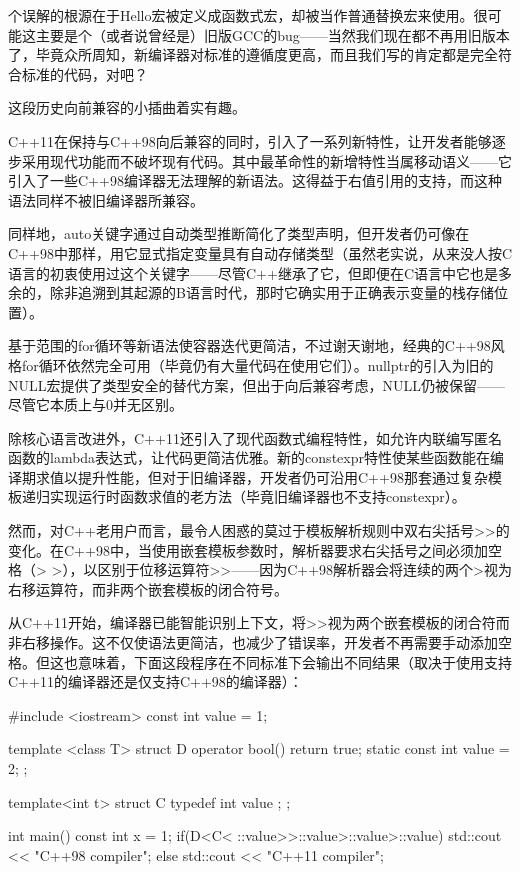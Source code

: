 个误解的根源在于Hello宏被定义成函数式宏，却被当作普通替换宏来使用。很可能这主要是个（或者说曾经是）旧版GCC的bug——当然我们现在都不再用旧版本了，毕竟众所周知，新编译器对标准的遵循度更高，而且我们写的肯定都是完全符合标准的代码，对吧？

这段历史向前兼容的小插曲着实有趣。


C++11在保持与C++98向后兼容的同时，引入了一系列新特性，让开发者能够逐步采用现代功能而不破坏现有代码。其中最革命性的新增特性当属移动语义——它引入了一些C++98编译器无法理解的新语法。这得益于右值引用的支持，而这种语法同样不被旧编译器所兼容。

同样地，auto关键字通过自动类型推断简化了类型声明，但开发者仍可像在C++98中那样，用它显式指定变量具有自动存储类型（虽然老实说，从来没人按C语言的初衷使用过这个关键字——尽管C++继承了它，但即便在C语言中它也是多余的，除非追溯到其起源的B语言时代，那时它确实用于正确表示变量的栈存储位置）。

基于范围的for循环等新语法使容器迭代更简洁，不过谢天谢地，经典的C++98风格for循环依然完全可用（毕竟仍有大量代码在使用它们）。nullptr的引入为旧的NULL宏提供了类型安全的替代方案，但出于向后兼容考虑，NULL仍被保留——尽管它本质上与0并无区别。

除核心语言改进外，C++11还引入了现代函数式编程特性，如允许内联编写匿名函数的lambda表达式，让代码更简洁优雅。新的constexpr特性使某些函数能在编译期求值以提升性能，但对于旧编译器，开发者仍可沿用C++98那套通过复杂模板递归实现运行时函数求值的老方法（毕竟旧编译器也不支持constexpr）。

然而，对C++老用户而言，最令人困惑的莫过于模板解析规则中双右尖括号>>的变化。在C++98中，当使用嵌套模板参数时，解析器要求右尖括号之间必须加空格（> >），以区别于位移运算符>>——因为C++98解析器会将连续的两个>视为右移运算符，而非两个嵌套模板的闭合符号。

从C++11开始，编译器已能智能识别上下文，将>>视为两个嵌套模板的闭合符而非右移操作。这不仅使语法更简洁，也减少了错误率，开发者不再需要手动添加空格。但这也意味着，下面这段程序在不同标准下会输出不同结果（取决于使用支持C++11的编译器还是仅支持C++98的编译器）：

\begin{cpp}
#include <iostream>
const int value = 1;

template <class T>
struct D {
  operator bool() {return true;}
  static const int value = 2;
};

template<int t> struct C {
  typedef int value ;
};

int main() {
  const int x = 1;
  if(D<C< ::value>>::value>::value>::value) {
    std::cout << "C++98 compiler";
  } else {
    std::cout << "C++11 compiler";
  }
}
\end{cpp}

